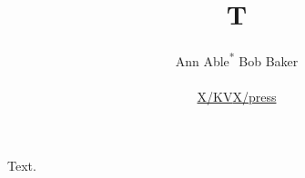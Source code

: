 \documentclass{article}
\newcommand{\repolink}{\href{https://github.com/x/press}{X/press}\xspace}
\begin{document}
\title{T}
\author{Ann Able\textsuperscript{*} Bob Baker\\ \begin{center} \href{https://x.org/kv}{X/KV}\quad \repolink \end{center}}
\maketitle
Text.
\end{document}
